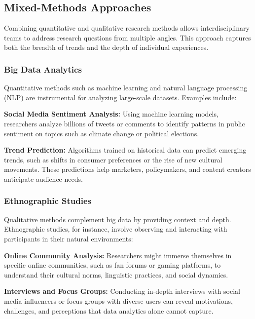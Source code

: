 \documentclass[
]{book}
\begin{document}
\subsection{Mixed-Methods Approaches}\label{mixed-methods-approaches}

Combining quantitative and qualitative research methods allows interdisciplinary teams to address research questions from multiple angles. This approach captures both the breadth of trends and the depth of individual experiences.

\subsubsection{Big Data Analytics}\label{big-data-analytics}

Quantitative methods such as machine learning and natural language processing (NLP) are instrumental for analyzing large-scale datasets. Examples include:

\textbf{Social Media Sentiment Analysis:} Using machine learning models, researchers analyze billions of tweets or comments to identify patterns in public sentiment on topics such as climate change or political elections.

\textbf{Trend Prediction:} Algorithms trained on historical data can predict emerging trends, such as shifts in consumer preferences or the rise of new cultural movements. These predictions help marketers, policymakers, and content creators anticipate audience needs.

\subsubsection{\texorpdfstring{\textbf{Ethnographic Studies}}{Ethnographic Studies}}\label{ethnographic-studies}

Qualitative methods complement big data by providing context and depth. Ethnographic studies, for instance, involve observing and interacting with participants in their natural environments:

\textbf{Online Community Analysis:} Researchers might immerse themselves in specific online communities, such as fan forums or gaming platforms, to understand their cultural norms, linguistic practices, and social dynamics.

\textbf{Interviews and Focus Groups:} Conducting in-depth interviews with social media influencers or focus groups with diverse users can reveal motivations, challenges, and perceptions that data analytics alone cannot capture.
\end{document}
